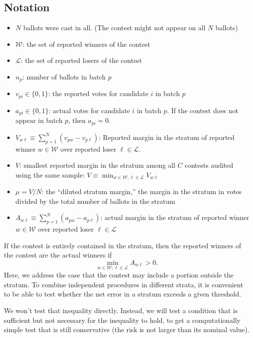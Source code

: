 \subsection{Notation}
\begin{itemize}
    \item  $N$ ballots were cast in all. (The contest might not appear on all $N$ ballots)
    \item  $\mathcal{W}$: the set of reported winners of the contest
    \item  $\mathcal{L}$: the set of reported losers of the contest
    \item  $n_p$: number of ballots in batch $p$
    \item  $v_{pi} \in \{0, 1\}$: the reported votes for candidate $i$ in batch $p$
    \item  $a_{pi} \in \{0, 1\}$: actual votes for candidate $i$ in batch $p$. 
                  If the contest does not appear in batch $p$, then $a_{pi} = 0$.
    \item  $V_{w\ell} \equiv \sum_{p=1}^N (v_{pw} - v_{p\ell})$: 
Reported margin in the stratum of reported winner $w \in \mathcal{W}$ over reported loser 
$\ell \in \mathcal{L}$.
    \item  $V$: smallest reported margin in the stratum among all $C$ contests audited using the same sample:
$V \equiv \min_{w \in \mathcal{W}, \ell \in \mathcal{L}} V_{w \ell}$
    \item  $\mu = V/N$: the ``diluted stratum margin,'' the margin in the stratum in votes divided by the total number of ballots in the stratum
    \item  $A_{w\ell} \equiv \sum_{p=1}^N (a_{pw} - a_{p\ell})$: 
actual margin in the stratum of reported winner $w \in \mathcal{W}$ over reported loser 
$\ell \in \mathcal{L}$
\end{itemize}
If the contest is entirely contained in the stratum, then
the reported winners of the contest are the actual winners if
$$ 
   \min_{w \in \mathcal{W}, \ell \in \mathcal{L}} A_{w\ell} > 0.
$$
Here, we address the case that the contest may include a portion outside the stratum.
To combine independent procedures in different strata, it is convenient
to be able to test whether the net error in a stratum exceeds a given threshold.

We won't test that inequality directly.
Instead, we will test a condition that is sufficient but not necessary for the
inequality to hold, to get a computationally simple test that
is still conservative (the risk is not larger than its nominal value).

